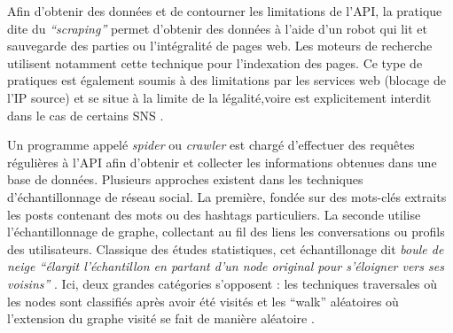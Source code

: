 Afin d{\textquoteright}obtenir des données et de contourner les limitations de l{\textquoteright}API, la pratique dite du \textit{{\textquotedblleft}scraping{\textquotedblright} }permet d{\textquoteright}obtenir des données à l{\textquoteright}aide d{\textquoteright}un robot qui lit et sauvegarde des parties ou l{\textquoteright}intégralité de pages web. Les moteurs de recherche utilisent notamment cette technique pour l{\textquoteright}indexation des pages. Ce type de pratiques est également soumis à des limitations par les services web (blocage de l{\textquoteright}IP source) et se situe à la limite de la légalité,voire est explicitement interdit dans le cas de certains SNS \citep{Petschulat2010}.

Un programme appelé \textit{spider }ou \textit{crawler} est chargé d{\textquoteright}effectuer des requ\^etes régulières à l{\textquoteright}API afin d{\textquoteright}obtenir et collecter les informations obtenues dans une base de données. Plusieurs approches existent dans les techniques d'échantillonnage de réseau social. La première, fondée sur des mots-clés extraits les posts contenant des mots ou des hashtags particuliers. La seconde utilise l{\textquoteright}échantillonnage de graphe, collectant au fil des liens les conversations ou profils des utilisateurs. Classique des études statistiques, cet échantillonage dit \textit{boule de neige {\textquotedblleft}élargit l{\textquoteright}échantillon en partant d{\textquoteright}un node original pour s{\textquoteright}éloigner vers ses voisins{\textquotedblright}} \citep{Rothenberg1995}. Ici, deux grandes catégories s{\textquoteright}opposent : les techniques traversales o\`u les nodes sont classifiés après avoir été visités et les {\textquotedblleft}walk{\textquotedblright} aléatoires o\`u l{\textquoteright}extension du graphe visité se fait de manière aléatoire \citep{Gjoka2011}.

